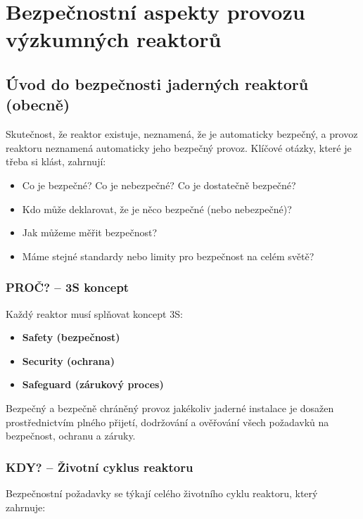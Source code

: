\section[Bezpečnost výzkumných reaktorů]{Bezpečnostní aspekty provozu výzkumných reaktorů}

\subsection{Úvod do bezpečnosti jaderných reaktorů (obecně)}

Skutečnost, že reaktor existuje, neznamená, že je automaticky bezpečný, a provoz reaktoru neznamená automaticky jeho bezpečný provoz. Klíčové otázky, které je třeba si klást, zahrnují:

\begin{itemize}
    \item Co je bezpečné? Co je nebezpečné? Co je dostatečně bezpečné?
    \item Kdo může deklarovat, že je něco bezpečné (nebo nebezpečné)?
    \item Jak můžeme měřit bezpečnost?
    \item Máme stejné standardy nebo limity pro bezpečnost na celém světě?
\end{itemize}

\subsubsection*{PROČ? -- 3S koncept}

Každý reaktor musí splňovat koncept 3S:

\begin{itemize}
    \item \textbf{Safety (bezpečnost)}
    \item \textbf{Security (ochrana)}
    \item \textbf{Safeguard (zárukový proces)}
\end{itemize}

Bezpečný a bezpečně chráněný provoz jakékoliv jaderné instalace je dosažen prostřednictvím plného přijetí, dodržování a ověřování všech požadavků na bezpečnost, ochranu a záruky.

\subsubsection*{KDY? -- Životní cyklus reaktoru}

Bezpečnostní požadavky se týkají celého životního cyklu reaktoru, který zahrnuje:

